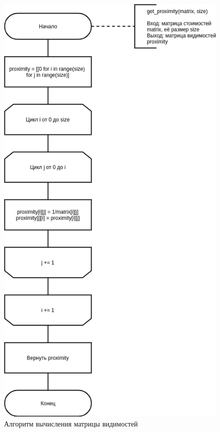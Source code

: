\begin{figure}[!h]
	\centering
	\includegraphics[scale=0.5]{images/proximity.png}
	\caption{Алгоритм вычисления матрицы видимостей}
	\label{img:proximity}
\end{figure}

